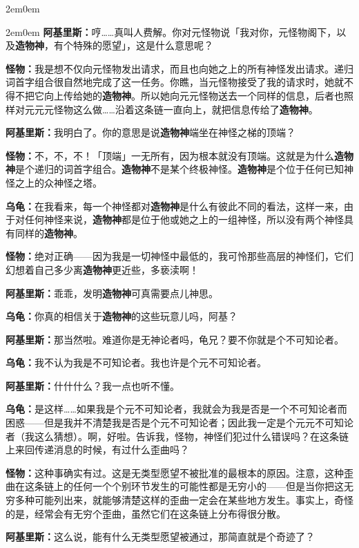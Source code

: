 \documentclass[
  12pt,
  twoside,
  openright,
  oldfontcommands,
]{memoir}
\newcommand{\heititext}[1]{{\heifamily\bfseries #1}}
\newcommand{\dialogname}[1]{{\heifamily\bfseries #1}}
\begin{document}
\begin{adjustwidth}{2em}{0em}
\begin{adjustwidth}{2em}{0em}
\dialogname{阿基里斯：}哼\ldots\ldots 真叫人费解。你对元怪物说「我对你，元怪物阁下，以及\heititext{造物神}，有个特殊的愿望」，这是什么意思呢？

\dialogname{怪物：}我是想不仅向元怪物发出请求，而且也向她之上的所有神怪发出请求。递归词首字组合很自然地完成了这一任务。你瞧，当元怪物接受了我的请求时，她就不得不把它向上传给她的\heititext{造物神}。所以她向元元怪物送去一个同样的信息，后者也照样对元元元怪物这么做\ldots\ldots 沿着这条链一直向上，就把信息传给了\heititext{造物神}。

\dialogname{阿基里斯：}我明白了。你的意思是说\heititext{造物神}端坐在神怪之梯的顶端？

\dialogname{怪物：}不，不，不！「顶端」一无所有，因为根本就没有顶端。这就是为什么\heititext{造物神}是个递归的词首字组合。\heititext{造物神}不是某个终极神怪。\heititext{造物神}是个位于任何已知神怪之上的众神怪之塔。

\dialogname{乌龟：}在我看来，每一个神怪都对\heititext{造物神}是什么有彼此不同的看法，这样一来，由于对任何神怪来说，\heititext{造物神}都是位于他或她之上的一组神怪，所以没有两个神怪具有同样的\heititext{造物神}。

\dialogname{怪物：}绝对正确------因为我是一切神怪中最低的，我可怜那些高层的神怪们，它们幻想着自己多少离\heititext{造物神}更近些，多亵渎啊！

\dialogname{阿基里斯：}乖乖，发明\heititext{造物神}可真需要点儿神思。

\dialogname{乌龟：}你真的相信关于\heititext{造物神}的这些玩意儿吗，阿基？

\dialogname{阿基里斯：}那当然啦。难道你是无神论者吗，龟兄？要不你就是个不可知论者。

\dialogname{乌龟：}我不认为我是不可知论者。我也许是个元不可知论者。

\dialogname{阿基里斯：}什什什么？我一点也听不懂。

\dialogname{乌龟：}是这样\ldots\ldots 如果我是个元不可知论者，我就会为我是否是一个不可知论者而困惑------但是我并不清楚我是否是个元不可知论者；因此我一定是个元元不可知论者（我这么猜想）。啊，好啦。告诉我，怪物，神怪们犯过什么错误吗？在这条链上来回传递消息的时候，有过什么歪曲吗？

\dialogname{怪物：}这种事确实有过。这是无类型愿望不被批准的最根本的原因。注意，这种歪曲在这条链上的任何一个个别环节发生的可能性都是无穷小的------但是当你把这无穷多种可能列出来，就能够清楚这样的歪曲一定会在某些地方发生。事实上，奇怪的是，经常会有无穷个歪曲，虽然它们在这条链上分布得很分散。

\dialogname{阿基里斯：}这么说，能有什么无类型愿望被通过，那简直就是个奇迹了？


\end{adjustwidth}
\end{adjustwidth}
\end{document}
